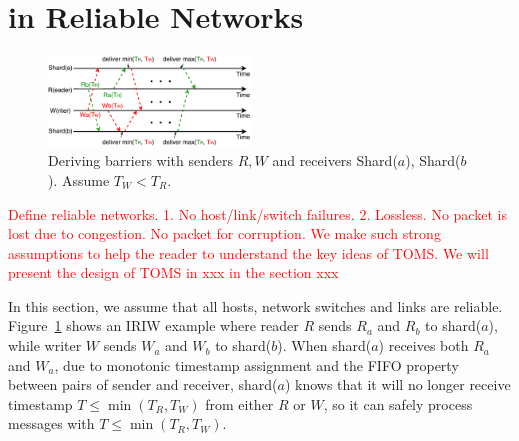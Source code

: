 \section{\sys in Reliable Networks}
\label{sec:design-reliable}

\begin{figure}[t]
\centering
\includegraphics[width=0.48\textwidth]{images/derive_barriers.pdf}
\caption{Deriving barriers with senders $R, W$ and receivers Shard($a$), Shard($b$). Assume $T_W < T_R$.}
\label{fig:barrier}
\vspace{-1em}
\end{figure}

\textcolor{red}{Define reliable networks. 1. No host/link/switch failures. 2. Lossless. No packet is lost due to congestion. No packet for corruption. We make such strong assumptions to help the reader to understand the key ideas of TOMS. We will present the design of TOMS in xxx in the section xxx}

In this section, we assume that all hosts, network switches and links are reliable.
Figure~\ref{fig:barrier} shows an IRIW example where reader $R$ sends $R_a$ and $R_b$ to shard($a$), while writer $W$ sends $W_a$ and $W_b$ to shard($b$).
When shard($a$) receives both $R_a$ and $W_a$, due to monotonic timestamp assignment and the FIFO property between pairs of sender and receiver, shard($a$) knows that it will no longer receive timestamp $T \leq \min(T_R, T_W)$ from either $R$ or $W$, so it can safely process messages with $T \leq \min(T_R, T_W)$.




